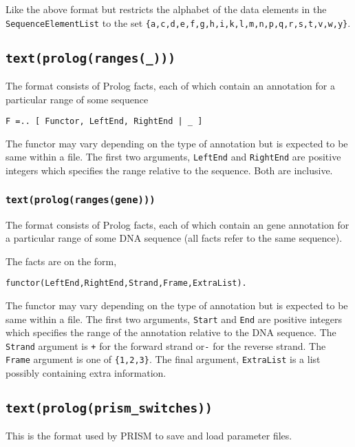 \documentclass{book}
\begin{document}
Like the above format but restricts the alphabet of the data elements
in the \texttt{SequenceElementList} to the set
\texttt{\{a,c,d,e,f,g,h,i,k,l,m,n,p,q,r,s,t,v,w,y\}}.

\subsection{\texttt{text(prolog(ranges(\_)))}} 

The format consists of Prolog facts, each of which contain an
annotation for a particular range of some sequence

\begin{verbatim}
F =.. [ Functor, LeftEnd, RightEnd | _ ]
\end{verbatim}

The functor may vary depending on the type of annotation but is
expected to be same within a file. The first two arguments,
\texttt{LeftEnd} and \texttt{RightEnd} are positive integers which specifies 
the range relative to the sequence. Both are inclusive.

\subsubsection{\texttt{text(prolog(ranges(gene)))}} 

The format consists of Prolog facts, each of which contain an
gene annotation for a particular range of some DNA sequence
 (all facts refer to the same sequence).

The facts are on the form, 
\begin{verbatim}
functor(LeftEnd,RightEnd,Strand,Frame,ExtraList).
\end{verbatim}

The functor may vary depending on the type of annotation but is
expected to be same within a file. The first two arguments,
\texttt{Start} and \texttt{End} are positive integers which specifies 
the range of the annotation relative to the DNA sequence. The
\texttt{Strand} argument is \texttt{+} for the forward strand
or\texttt{-} for the reverse strand. The \texttt{Frame} argument
is one of \texttt{\{1,2,3\}}. The final argument, \texttt{ExtraList}
is a list possibly containing extra information.

\subsection{\texttt{text(prolog(prism\_switches))}}

This is the format used by PRISM to save and load parameter files.
\end{document}
